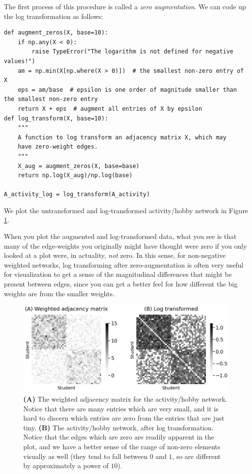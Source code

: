 The first process of this procedure is called a \emph{zero augmentation}. We can code up the log transformation as follows:


\begin{lstlisting}[style=python]
def augment_zeros(X, base=10):
    if np.any(X < 0):
        raise TypeError("The logarithm is not defined for negative values!")
    am = np.min(X[np.where(X > 0)])  # the smallest non-zero entry of X
    eps = am/base  # epsilon is one order of magnitude smaller than the smallest non-zero entry
    return X + eps  # augment all entries of X by epsilon
def log_transform(X, base=10):
    """
    A function to log transform an adjacency matrix X, which may
    have zero-weight edges.
    """
    X_aug = augment_zeros(X, base=base)
    return np.log(X_aug)/np.log(base)

A_activity_log = log_transform(A_activity)
\end{lstlisting}

We plot the untransformed and log-transformed activity/hobby network in Figure \ref{fig:ch4:log_xfm}. 

When you plot the augmented and log-transformed data, what you see is that many of the edge-weights you originally might have thought were zero if you only looked at a plot were, in actuality, \emph{not} zero. In this sense, for non-negative weighted networks, log transforming after zero-augmentation is often very useful for visualization to get a sense of the magnitudinal differences that might be present between edges, since you can get a better feel for how different the big weights are from the smaller weights.

\begin{figure}[h]
    \centering
    \includegraphics[width=\linewidth]{representations/ch4/Images/log_xfm.png}
    \caption[Log-transforming heavy-tailed edge-weights]{\textbf{(A)} The weighted adjacency matrix for the activity/hobby network. Notice that there are many entries which are very small, and it is hard to discern which entries are zero from the entries that are just tiny. \textbf{(B)} The activity/hobby network, after log transformation. Notice that the edges which are zero are readily apparent in the plot, and we have a better sense of the range of non-zero elements visually as well (they tend to fall between $0$ and $1$, so are different by approximately a power of $10$).}
    \label{fig:ch4:log_xfm}
\end{figure}
